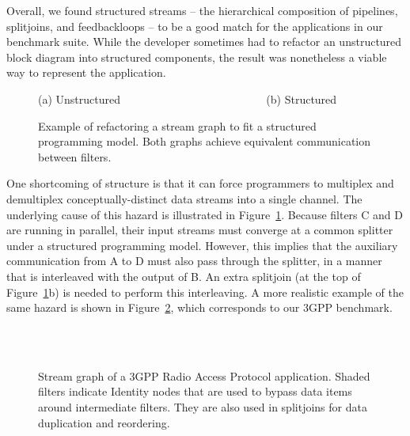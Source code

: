 \mybegin

  Overall, we found structured streams --
  the hierarchical composition of pipelines, splitjoins, and
  feedbackloops -- to be a good match for the applications in our
  benchmark suite.  While the developer sometimes had to refactor an
  unstructured block diagram into structured components, the result
  was nonetheless a viable way to represent the application.

\begin{figure}[t]
\centering
{}

(a) Unstructured ~~~~~~~~~~~~~~~~~~~~~~~~~ (b) Structured~~~~~~
\caption[Refactoring a stream graph to fit a structured programming
  model.]{Example of refactoring a stream graph to fit a structured
  programming model.  Both graphs achieve equivalent communication
  between filters.
\protect\label{fig:interleaving}}
\end{figure}

  One shortcoming of structure is that it can force programmers to
  multiplex and demultiplex conceptually-distinct data streams into a
  single channel.  The underlying cause of this hazard is illustrated
  in Figure~\ref{fig:interleaving}.  Because filters C and D are
  running in parallel, their input streams must converge at a common
  splitter under a structured programming model.  However, this
  implies that the auxiliary communication from A to D must also pass
  through the splitter, in a manner that is interleaved with the
  output of B.  An extra splitjoin (at the top of
  Figure~\ref{fig:interleaving}b) is needed to perform this
  interleaving.  A more realistic example of the same hazard is shown
  in Figure~\ref{fig:3gpp}, which corresponds to our 3GPP benchmark.

\begin{figure}[t!]
\vspace{-0.9in} ~ \\
\mbox{~}\hspace{2.03in}\begin{minipage}{4in}
\caption[Use of Identity filters is illustrated by the 3GPP benchmark.]{Stream graph of a 3GPP Radio Access
  Protocol application.  Shaded filters indicate Identity nodes that
  are used to bypass data items around intermediate filters.  They are
  also used in splitjoins for data duplication and
  reordering.\protect\label{fig:3gpp}}
\vspace{-0.5in}
\end{minipage}
\end{figure}

